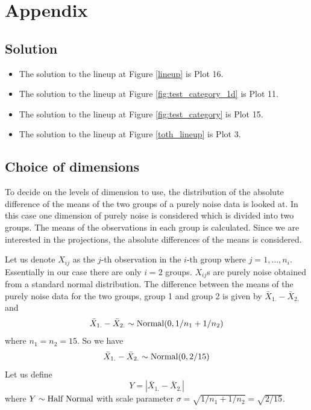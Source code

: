 
\section{Appendix}

\subsection{Solution}
\begin{itemize}
\item The solution to the lineup at Figure \ref{lineup} is Plot 16. 
\item The solution to the lineup at Figure \ref{fig:test_category_1d} is Plot 11.
\item The solution to the lineup at Figure \ref{fig:test_category} is Plot 15.
\item The solution to the lineup at Figure \ref{toth_lineup} is Plot 3.


\end{itemize}

\subsection{Choice of dimensions} \label{sec:theory}

To decide on the levels of dimension to use, the distribution of the absolute difference of the means of the two groups of a purely noise data is looked at. In this case one dimension of purely noise is considered which is divided into two groups. The means of the observations in each group is calculated. Since we are interested in the projections, the absolute differences of the means is considered.

Let us denote $X_{ij}$ as the $j$-th observation in the $i$-th group where $j = 1, \dots, n_i$. Essentially in our case there are only $i = 2$ groups. $X_{ij}$s are purely noise obtained from a standard normal distribution. The difference between the means of the purely noise data for the two groups, group 1 and group 2 is given by $\bar{X}_{1.} - \bar{X}_{2.}$ and $$\bar{X}_{1.} - \bar{X}_{2.} \sim \hbox{Normal}(0, 1/n_1 + 1/n_2)$$ where $n_1 = n_2 = 15$. So we have $$\bar{X}_{1.} - \bar{X}_{2.} \sim \hbox{Normal}(0, 2/15)$$ Let us define $$Y  = |\bar{X}_{1.} - \bar{X}_{2.}|$$ where $Y \sim \hbox{Half Normal}$ with scale parameter $ \sigma = \sqrt{1/n_1 + 1/n_2} = \sqrt{2/15}$. \\

